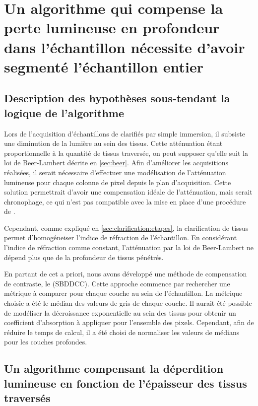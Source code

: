 \documentclass[\main/main.tex]{subfiles}
\begin{document}
\section{Un algorithme qui compense la perte lumineuse en profondeur dans l'échantillon nécessite d'avoir segmenté l'échantillon entier
\label{sbddcc}
}

\subsection{Description des hypothèses sous\hyp{}tendant la logique de l'algorithme}

%
Lors de l'acquisition d'échantillons de \pz{} clarifiés par simple immersion,
il subsiste une diminution de la lumière au sein des tissus.
%
Cette atténuation étant proportionnelle à la quantité de tissus traversée,
on peut supposer qu'elle suit la loi de Beer\hyp{}Lambert décrite en \autoref{sec:beer}.
%
Afin d'améliorer les acquisitions réalisées,
il serait nécessaire d'effectuer une modélisation de l'atténuation lumineuse pour chaque colonne de pixel depuis le plan d'acquisition.
%
Cette solution permettrait d'avoir une compensation idéale de l'atténuation, mais serait chronophage, ce qui n'est pas compatible avec la mise en place d'une procédure de \hcs{}.

%
Cependant, comme expliqué en \autoref{sec:clarification:etapes}, la clarification de tissus permet d'homogéneiser l'indice de réfraction de l'échantillon.
%
En considérant l'indice de réfraction comme constant, l'atténuation par la loi de Beer\hyp{}Lambert ne dépend plus que de la profondeur de tissus pénétrés.

%
En partant de cet a priori, nous avons développé une méthode de compensation de contraste, le \sbddcc (SBDDCC).
%
Cette approche commence par rechercher une métrique à comparer pour chaque couche au sein de l'échantillon.
%
La métrique choisie a été le médian des valeurs de gris de chaque couche.
%
Il aurait été possible de modéliser la décroissance exponentielle au sein des tissus pour obtenir un coefficient d'absorption à appliquer pour l'ensemble des pixels.
%
Cependant, afin de réduire le temps de calcul, il a été choisi de normaliser les valeurs de médians pour les couches profondes.

\subsection{Un algorithme compensant la déperdition lumineuse en fonction de l'épaisseur des tissus traversés}
\end{document}
